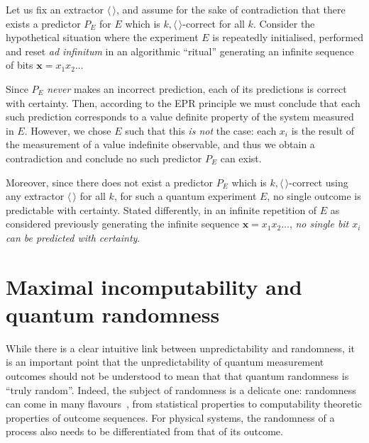 \documentclass[%
 superscriptaddress,
 preprint,
 showpacs,
 showkeys,
 preprintnumbers,
  amsmath,amssymb,
  aps,
 pra,
  longbibliography,
  floatfix,
 ]{revtex4-1}
\theoremstyle{definition}
\newcommand{\x}{\mathbf{x}}
\begin{document}
Let us fix an extractor $\langle\,  \rangle$, and
assume for the sake of contradiction that there exists a predictor $P_E$ for $E$ which is $k,\langle \, \rangle$-correct for all $k$.
Consider the hypothetical situation where the experiment $E$ is repeatedly initialised, performed and reset \emph{ad infinitum} in an algorithmic ``ritual'' generating an infinite sequence of bits $\x=x_1x_2\dots$

Since $P_E$ \emph{never} makes an incorrect prediction, each of its predictions is correct with certainty.
Then, according to the EPR principle we must conclude that each such prediction corresponds to a value definite property of the system measured in $E$.
However, we chose $E$ such that this {\it  is not}  the case: each $x_i$ is the result of the measurement of a value indefinite observable, and thus we obtain a contradiction and conclude no such predictor $P_E$ can exist.

Moreover, since there does not exist a predictor $P_E$ which is $k,\langle \, \rangle$-correct using any extractor $\langle\, \rangle$ for all $k$, for such a quantum experiment $E$, no single outcome is predictable with certainty.
Stated differently, in an infinite repetition of $E$ as considered previously generating the infinite sequence $\x=x_1x_2\dots$, \emph{no single bit $x_i$ can be predicted with certainty}.

\section{Maximal incomputability and quantum randomness}



While there is a clear intuitive link between unpredictability and randomness, %
it is an important point that the unpredictability of quantum measurement outcomes should not be understood to mean that that quantum randomness is ``truly random''.
Indeed, the subject of randomness is a delicate one:
randomness can come in many flavours~\cite{DH}, from statistical properties to computability theoretic properties of outcome sequences.
For physical systems, the randomness of a process also needs to be differentiated from that of its outcome.
\end{document}
